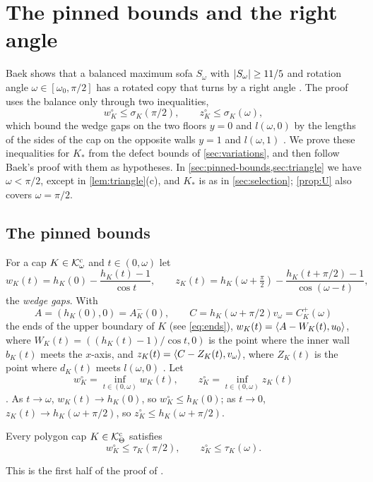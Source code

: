 \section{The pinned bounds and the right angle}\label{sec:right-angle}

Baek shows that a balanced maximum sofa $S_\omega$ with $\lvert S_\omega\rvert\ge11/5$
and rotation angle $\omega\in[\omega_0,\pi/2]$ has a rotated copy that turns by
a right angle . The proof uses the balance only through two
inequalities,
\[
  w^\circ_K\le\sigma_K(\pi/2),\qquad z^\circ_K\le\sigma_K(\omega),
\]
which bound the wedge gaps on the two floors $y=0$ and $l(\omega,0)$ by the
lengths of the sides of the cap on the opposite walls $y=1$ and $l(\omega,1)$
. We prove these inequalities for $K_*$ from the defect bounds
of \cref{sec:variations}, and then follow Baek's proof with them as hypotheses.
In \cref{sec:pinned-bounds,sec:triangle} we have $\omega<\pi/2$, except in
\cref{lem:triangle}(c), and $K_*$ is as in \cref{sec:selection}; \cref{prop:U}
also covers $\omega=\pi/2$.

\subsection{The pinned bounds}\label{sec:pinned-bounds}

For a cap $K\in\mathcal{K}^{\mathrm{c}}_\omega$ and $t\in(0,\omega)$ let
\[
  w_K(t)=h_K(0)-\frac{h_K(t)-1}{\cos t},\qquad
  z_K(t)=h_K(\omega+\tfrac\pi2)-\frac{h_K(t+\pi/2)-1}{\cos(\omega-t)},
\]
the \emph{wedge gaps}. With
\[
  A=(h_K(0),0)=A_K^-(0),\qquad C=h_K(\omega+\pi/2)v_\omega=C_K^+(\omega)
\]
the ends of the upper boundary of $K$ (see \eqref{eq:ends}),
$w_K(t)=\langle A-W_K(t),u_0\rangle$, where $W_K(t)=((h_K(t)-1)/\cos t,0)$ is the point
where the inner wall $b_K(t)$ meets the $x$-axis, and
$z_K(t)=\langle C-Z_K(t),v_\omega\rangle$, where $Z_K(t)$ is the point where $d_K(t)$
meets $l(\omega,0)$ . Let
\[
  w^\circ_K=\inf_{t\in(0,\omega)}w_K(t),\qquad
  z^\circ_K=\inf_{t\in(0,\omega)}z_K(t)
\]
. As $t\to\omega$, $w_K(t)\to h_K(0)$, so $w^\circ_K\le
h_K(0)$; as $t\to0$, $z_K(t)\to h_K(\omega+\pi/2)$, so $z^\circ_K\le
h_K(\omega+\pi/2)$.

\begin{lemma}\label{lem:wedge}
Every polygon cap $K\in\mathcal{K}^{\mathrm{c}}_\Theta$ satisfies
\[
  w^\circ_K\le\tau_K(\pi/2),\qquad z^\circ_K\le\tau_K(\omega).
\]
\end{lemma}

This is the first half of the proof of .

